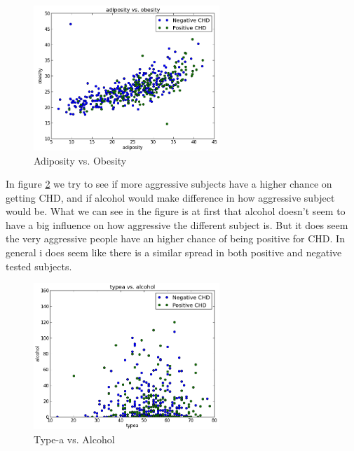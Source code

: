 \begin{figure}[H]
\centering
\includegraphics[width=7cm, keepaspectratio=true]{pictures/adiposityObesity.png}
\vspace{-0.4cm}
\caption{\footnotesize Adiposity vs. Obesity}
\label{ObeAsi}
\end{figure}

In figure \ref{typeAlco} we try to see if more aggressive subjects have a higher chance on getting CHD, and if alcohol would make difference in how aggressive subject would be. What we can see in the figure is at first that alcohol doesn't seem to have a big influence on how aggressive the different subject is. But it does seem the very aggressive people have an higher chance of being positive for CHD. In general i does seem like there is a similar spread in both positive and negative tested subjects.

\begin{figure}[H]
\centering
\includegraphics[width=7cm, keepaspectratio=true]{pictures/typeaalcohol.png}
\vspace{-0.4cm}
\caption{\footnotesize Type-a vs. Alcohol}
\label{typeAlco}
\end{figure}